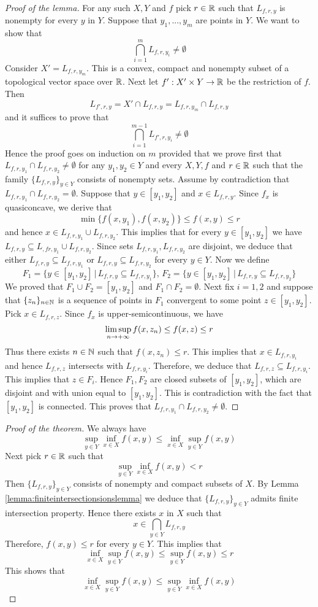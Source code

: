 \begin{proof}[Proof of the lemma]
For any such $X, Y$ and $f$ pick $r\in {\mathbb R}$ such that $L_{f,r,y}$ is nonempty for every $y$ in $Y$. Suppose that $y_1,...,y_{m}$ are points in $Y$. We want to show that
$$\bigcap_{i=1}^{m}L_{f,r,y_i} \neq \emptyset$$
Consider $X' = L_{f,r,y_{m}}$. This is a convex, compact and nonempty subset of a topological vector space over ${\mathbb R}$. Next let $f':X'\times Y\rightarrow {\mathbb R}$ be the restriction of $f$. Then
$$L_{f',r,y} = X' \cap L_{f,r,y} = L_{f,r,y_{m}} \cap L_{f,r,y}$$
and it suffices to prove that
$$\bigcap_{i=1}^{m-1} L_{f',r,y_i} \neq \emptyset$$
Hence the proof goes on induction on $m$ provided that we prove first that $L_{f,r,y_1}\cap L_{f,r,y_2}\neq \emptyset$ for any $y_1, y_2\in Y$ and every $X, Y, f$ and $r\in {\mathbb R}$ such that the family $\{L_{f,r,y}\}_{y\in Y}$ consists of nonempty sets. Assume by contradiction that $L_{f,r,y_1}\cap L_{f,r,y_2} = \emptyset$. Suppose that $y\in [y_1,y_2]$ and $x\in L_{f,r,y}$. Since $f_x$ is quasiconcave, we derive that
$$\min\{f(x,y_1),f(x,y_2)\} \leq f(x,y) \leq r$$
and hence $x\in L_{f,r,y_1}\cup L_{f,r,y_2}$. This implies that for every $y\in [y_1,y_2]$ we have $L_{f,r,y} \subseteq L_{,fr,y_1}\cup L_{f,r,y_2}$. Since sets $L_{f,r,y_1}, L_{f,r,y_2}$ are disjoint, we deduce that either $L_{f,r,y}\subseteq L_{f,r,y_1}$ or $L_{f,r,y}\subseteq L_{f,r,y_2}$ for every $y\in Y$. Now we define
$$F_1 = \big\{y\in [y_1,y_2]\,\big|\,L_{f,r,y}\subseteq L_{f,r,y_1}\big\},\,F_2 = \big\{y\in [y_1,y_2]\,\big|\,L_{f,r,y}\subseteq L_{f,r,y_2}\big\}$$
We proved that $F_1\cup F_2 = [y_1,y_2]$ and $F_1\cap F_2 = \emptyset$. Next fix $i = 1,2$ and suppose that $\{z_n\}_{n\in {\mathbb N}}$ is a sequence of points in $F_1$ convergent to some point $z\in [y_1,y_2]$. Pick $x\in L_{f,r,z}$. Since $f_x$ is upper-semicontinuous, we have
$$\limsup_{n\rightarrow +\infty}f(x,z_n) \leq f(x,z)\leq r$$
Thus there exists $n\in {\mathbb N}$ such that $f(x,z_n)\leq r$. This implies that $x\in L_{f,r,y_i}$ and hence $L_{f,r,z}$ intersects with $L_{f,r,y_i}$. Therefore, we deduce that $L_{f,r,z}\subseteq L_{f,r,y_i}$. This implies that $z\in F_i$. Hence $F_1, F_2$ are closed subsets of $[y_1,y_2]$, which are disjoint and with union equal to $[y_1,y_2]$. This is contradiction with the fact that $[y_1,y_2]$ is connected. This proves that $L_{f,r,y_1}\cap L_{f,r,y_2}\neq \emptyset$.
\end{proof}

\begin{proof}[Proof of the theorem]
We always have
$$\sup_{y\in Y}\inf_{x\in X}f(x,y)\leq \inf_{x\in X}\sup_{y\in Y}f(x,y)$$
Next pick $r\in {\mathbb R}$ such that
$$\sup_{y\in Y}\inf_{x\in X}f(x,y) < r$$
Then $\{L_{f,r,y}\}_{y\in Y}$ consists of nonempty and compact subsets of $X$. By Lemma \ref{lemma:finiteintersectionsionslemma} we deduce that $\{L_{f,r,y}\}_{y\in Y}$ admits finite intersection property. Hence there exists $x$ in $X$ such that
$$x\in \bigcap_{y\in Y}L_{f,r,y}$$
Therefore, $f(x,y)\leq r$ for every $y\in Y$. This implies that
$$\inf_{x\in X}\sup_{y\in Y}f(x,y)\leq \sup_{y\in Y}f(x,y)\leq r$$
This shows that
$$\inf_{x\in X}\sup_{y\in Y}f(x,y) \leq \sup_{y\in Y}\inf_{x\in X}f(x,y)$$
\end{proof}

